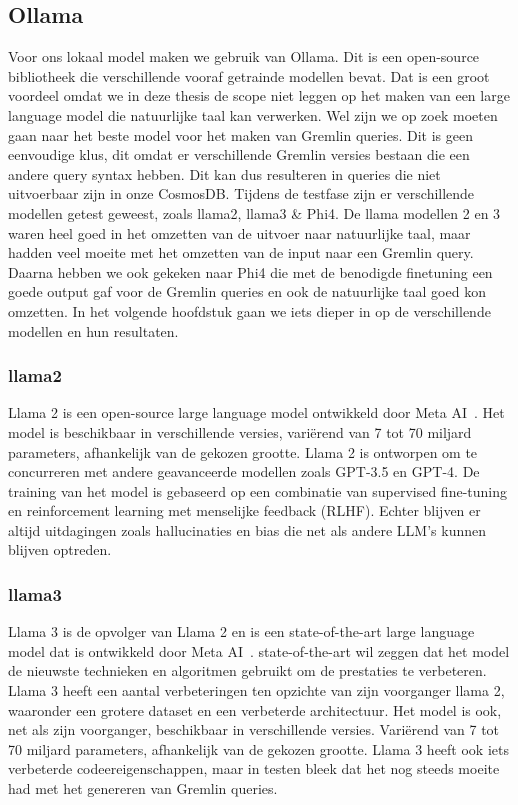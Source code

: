 \subsection{Ollama}
Voor ons lokaal model maken we gebruik van Ollama. Dit is een open-source bibliotheek die verschillende vooraf getrainde modellen bevat. 
Dat is een groot voordeel omdat we in deze thesis de scope niet leggen op het maken van een large language model die natuurlijke taal kan verwerken.
Wel zijn we op zoek moeten gaan naar het beste model voor het maken van Gremlin queries. Dit is geen eenvoudige klus, dit omdat er verschillende Gremlin versies bestaan die een andere query syntax hebben.
Dit kan dus resulteren in queries die niet uitvoerbaar zijn in onze CosmosDB.\@
Tijdens de testfase zijn er verschillende modellen getest geweest, zoals llama2, llama3 \& Phi4.
De llama modellen 2 en 3 waren heel goed in het omzetten van de uitvoer naar natuurlijke taal, maar hadden veel moeite met het omzetten van de input naar een Gremlin query.
Daarna hebben we ook gekeken naar Phi4 die met de benodigde finetuning een goede output gaf voor de Gremlin queries en ook de natuurlijke taal goed kon omzetten.
In het volgende hoofdstuk gaan we iets dieper in op de verschillende modellen en hun resultaten.

\subsubsection{llama2}
Llama 2 is een open-source large language model ontwikkeld door Meta AI~\autocite{llama2}. 
Het model is beschikbaar in verschillende versies, variërend van 7 tot 70 miljard parameters, afhankelijk van de gekozen grootte.
Llama 2 is ontworpen om te concurreren met andere geavanceerde modellen zoals GPT-3.5 en GPT-4.
De training van het model is gebaseerd op een combinatie van supervised fine-tuning en reinforcement learning met menselijke feedback (RLHF).
Echter blijven er altijd uitdagingen zoals hallucinaties en bias die net als andere LLM's kunnen blijven optreden.

\subsubsection{llama3}
Llama 3 is de opvolger van Llama 2 en is een state-of-the-art large language model dat is ontwikkeld door Meta AI~\autocite{Meta2024}.
state-of-the-art wil zeggen dat het model de nieuwste technieken en algoritmen gebruikt om de prestaties te verbeteren.
Llama 3 heeft een aantal verbeteringen ten opzichte van zijn voorganger llama 2, waaronder een grotere dataset en een verbeterde architectuur.
Het model is ook, net als zijn voorganger, beschikbaar in verschillende versies. Variërend van 7 tot 70 miljard parameters, afhankelijk van de gekozen grootte.
Llama 3 heeft ook iets verbeterde codeereigenschappen, maar in testen bleek dat het nog steeds moeite had met het genereren van Gremlin queries.

